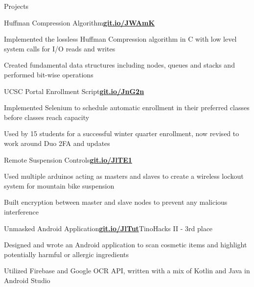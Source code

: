 \documentclass{resume}
\begin{document}
\begin{rSection}{\large Projects}

 \begin{rSubsection}{Huffman Compression Algorithm}{\href{https://git.io/JWAmK}{\bf{{git.io/JWAmK}}}}{}{}
\item Implemented the lossless Huffman Compression algorithm in C with low level system calls for I/O reads and writes
\item Created fundamental data structures including nodes, queues and stacks and performed bit-wise operations
\end{rSubsection}


 \begin{rSubsection}{UCSC Portal Enrollment Script}{\href{https://git.io/JnG2n}{\bf{{git.io/JnG2n}}}}{}{}
\item Implemented Selenium to schedule automatic enrollment in their preferred classes before classes reach capacity 
 \item Used by 15 students for a successful winter quarter enrollment, now revised to work around Duo 2FA and updates
\end{rSubsection}

\begin{rSubsection}{Remote Suspension Controls}{\href{https://git.io/JlTE1}{{\bf{git.io/JlTE1}}}}{}{}
\item Used multiple arduinos acting as masters and slaves to create a wireless lockout system for mountain bike suspension
\item Built encryption between master and slave nodes to prevent any malicious interference
\end{rSubsection}

\begin{rSubsection}{Unmasked Android Application}{\href{https://git.io/JlTut}{\bf{{git.io/JlTut}}}}{TinoHacks II - 3rd place}{}
\item Designed and wrote an Android application to scan cosmetic items and highlight potentially harmful or allergic ingredients
\item Utilized Firebase and Google OCR API, written with a mix of Kotlin and Java in Android Studio
\end{rSubsection}

\end{rSection}
\end{document}
